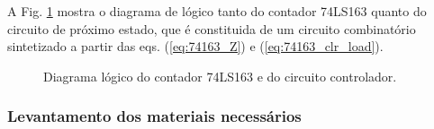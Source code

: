 \documentclass[a4,12pt]{horizon-theme}
\begin{document}
A Fig. \ref{fig:diagrama_logico_74163} mostra o diagrama de lógico tanto do contador 74LS163 quanto do circuito de próximo estado, que é constituida de um circuito combinatório sintetizado a partir das eqs. (\ref{eq:74163_Z}) e (\ref{eq:74163_clr_load}).

\begin{figure}[!ht]
  \centering
  \caption{Diagrama lógico do contador 74LS163 e do circuito controlador.}
  \label{fig:diagrama_logico_74163}
\end{figure}

\subsubsection{Levantamento dos materiais necessários}
\label{sec:plan_74163_levantamento}
\end{document}
